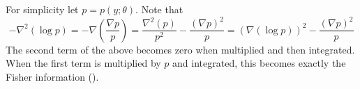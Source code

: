 \begin{answer}
	For simplicity let $p = p(y;\theta).$ 
	Note that 
	$$-\nabla^2(\log p) = -\nabla (\frac{\nabla p}{p}) = \frac{\nabla^2(p)}{p^2} - \frac{(\nabla p)^2}{p} = (\nabla (\log p))^2 - \frac{(\nabla p)^2}{p}$$
	The second term of the above becomes zero when multiplied and then integrated. When the first term is multiplied by $p$ and integrated,
	this becomes exactly the Fisher information (\theta).
\end{answer}
